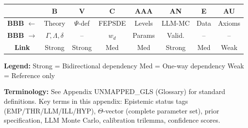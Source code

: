 \documentclass[11pt,a4paper]{article}
\theoremstyle{definition}
\begin{document}
\begin{tcolorbox}[colback=gray!5!white, colframe=gray!75!black, 
    title=\textbf{Cross-Reference Map}]

\begin{center}
\small
\begin{tabular}{@{}c|ccccccc@{}}
\toprule
& \textbf{B} & \textbf{V} & \textbf{C} & \textbf{AAA} & \textbf{AN} & \textbf{E} & \textbf{AU} \\
\midrule
\textbf{BBB $\leftarrow$} & Theory & $\Psi$-def & FEPSDE & Levels & LLM-MC & Data & Axioms \\
\textbf{BBB $\rightarrow$} & $\Gamma,\Lambda,\delta$ & -- & $w_d$ & Params & Valid. & -- & -- \\
\midrule
\textbf{Link} & \cellcolor{red!20}Strong & \cellcolor{red!20}Strong & \cellcolor{yellow!20}Med & \cellcolor{yellow!20}Med & \cellcolor{red!20}Strong & \cellcolor{yellow!20}Med & \cellcolor{green!20}Weak \\
\bottomrule
\end{tabular}
\end{center}

\textbf{Legend:} 
\colorbox{red!20}{Strong} = Bidirectional dependency \quad
\colorbox{yellow!20}{Med} = One-way dependency \quad
\colorbox{green!20}{Weak} = Reference only

\end{tcolorbox}


\begin{tcolorbox}[colback=gray!5!white, colframe=gray!50!black]
\textbf{Terminology:} See Appendix UNMAPPED_GLS (Glossary) for standard definitions.
Key terms in this appendix: Epistemic status tags (EMP/THR/LLM/ILL/HYP),
$\Theta$-vector (complete parameter set), prior specification,
LLM Monte Carlo, calibration trilemma, confidence scores.
\end{tcolorbox}
\end{document}

